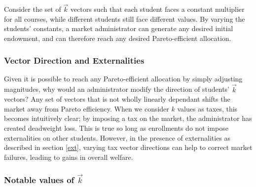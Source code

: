 \documentclass{article}
\begin{document}
Consider the set of $\vec{k}$ vectors such that each student faces a constant multiplier for all courses, while different students still face different values. By varying the students' constants, a market administrator can generate any desired initial endowment, and can therefore reach any desired Pareto-efficient allocation.


\subsubsection{Vector Direction and Externalities}

Given it is possible to reach any Pareto-efficient allocation by simply adjusting magnitudes, why would an administrator modify the direction of students' $\vec{k}$ vectors? Any set of vectors that is not wholly linearly dependant shifts the market away from Pareto efficiency. When we consider $k$ values as taxes, this becomes intuitively clear; by imposing a tax on the market, the administrator has created deadweight loss. This is true so long as enrollments do not impose externalities on other students. However, in the presence of externalities as described in section \ref{ext}, varying tax vector directions can help to correct market failures, leading to gains in overall welfare.

\subsubsection{Notable values of $\vec{k}$}
\end{document}
